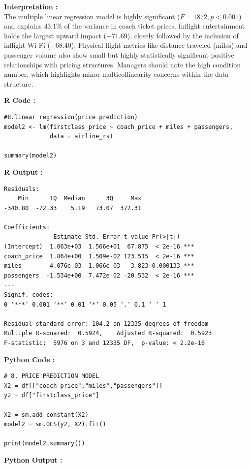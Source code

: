 \documentclass[11pt,a4paper]{article}
\begin{document}
\newpage
\noindent \textbf{Interpretation :} \\
The multiple linear regression model is highly significant ($F = 1872, p < 0.001$) and explains $43.1\%$ of the variance in coach ticket prices. Inflight entertainment holds the largest upward impact ($+71.69$), closely followed by the inclusion of inflight Wi-Fi ($+68.40$). Physical flight metrics like distance traveled (miles) and passenger volume also show small but highly statistically significant positive relationships with pricing structures. Managers should note the high condition number, which highlights minor multicollinearity concerns within the data structure.
\vspace{2.5em}

\noindent \textbf{R Code :}
\begin{codebox}
\begin{lstlisting}[style=Rstyle]
#8.linear regression(price prediction)
model2 <- lm(firstclass_price ~ coach_price + miles + passengers,
             data = airline_rs)

summary(model2)

\end{lstlisting}
\end{codebox}

\vspace{0.5em}
\noindent \textbf{R Output :}

\begin{verbatim}
Residuals:
    Min      1Q  Median      3Q     Max 
-340.80  -72.33    5.19   73.07  372.31 

Coefficients:
              Estimate Std. Error t value Pr(>|t|)    
(Intercept)  1.063e+03  1.566e+01  67.875  < 2e-16 ***
coach_price  1.864e+00  1.509e-02 123.515  < 2e-16 ***
miles        4.076e-03  1.066e-03   3.823 0.000133 ***
passengers  -1.534e+00  7.472e-02 -20.532  < 2e-16 ***
---
Signif. codes:  
0 ‘***’ 0.001 ‘**’ 0.01 ‘*’ 0.05 ‘.’ 0.1 ‘ ’ 1

Residual standard error: 104.2 on 12335 degrees of freedom
Multiple R-squared:  0.5924,	Adjusted R-squared:  0.5923 
F-statistic:  5976 on 3 and 12335 DF,  p-value: < 2.2e-16

\end{verbatim}
\vspace{0.5em}
\noindent \textbf{Python Code :}
\begin{codebox}
\begin{lstlisting}[style=Pythonstyle]
# 8. PRICE PREDICTION MODEL
X2 = df[["coach_price","miles","passengers"]]
y2 = df["firstclass_price"]

X2 = sm.add_constant(X2)
model2 = sm.OLS(y2, X2).fit()

print(model2.summary())
\end{lstlisting}
\end{codebox}
\vspace{0.5em}
\noindent \textbf{Python Output :}
\end{document}
